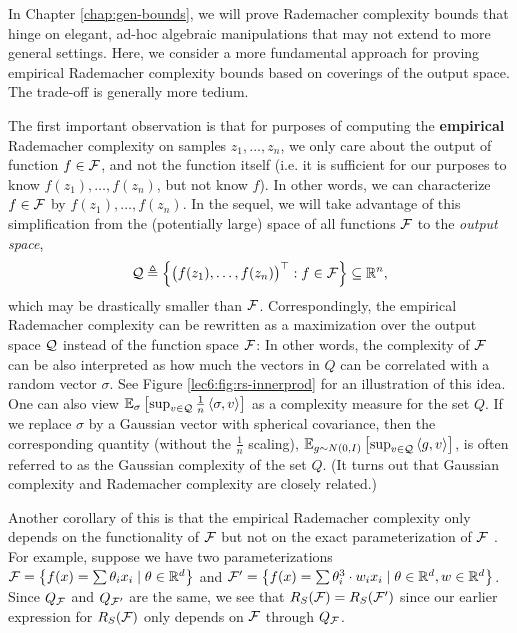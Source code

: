 
In Chapter \ref{chap:gen-bounds}, we will prove Rademacher complexity bounds that hinge on elegant, ad-hoc algebraic manipulations that may not extend to more general settings. Here, we consider a more fundamental approach for proving empirical Rademacher complexity bounds based on coverings of the output space. The trade-off is generally more tedium.

The first important observation is that for purposes of computing the \textbf{empirical} Rademacher complexity on samples $z_1, ..., z_n$, 
we only care about the output of function $f \in \mathcal F$, and not the function itself (i.e. it is sufficient for our purposes to know $f(z_1),\dots, f(z_n)$, but not know $f$). In other words, we can characterize $f \in \mathcal F$ by $f(z_1),\dots, f(z_n)$. In the sequel, we will take advantage of this simplification from the (potentially large) space of all functions $\mathcal F$ to the \textit{output space},
\begin{equation}
\mathcal Q \triangleq \left\{ \begin{pmatrix} f(z_1), \dots, f(z_n) \end{pmatrix}^\top: f\in \mathcal F\right\} \subseteq \mathbb R^n, \label{lec6:eqn:shattercoef}
\end{equation}
which may be drastically smaller than $\mathcal F$. Correspondingly, the empirical Rademacher complexity can be rewritten as a maximization over the output space $\mathcal Q$ instead of the function space $\mathcal F$: 
In other words, the complexity of $\mathcal F$ can be also interpreted as how much the vectors in $Q$ can be correlated with a random vector $\sigma.$ See Figure \ref{lec6:fig:rs-innerprod} for an illustration of this idea. One can also view $\operatorname*{\mathbb{E}}_\sigma \left[\sup_{v\in \mathcal Q} \frac 1 n \left\langle\sigma, v\right\rangle\right]$ as a complexity measure for the set $Q$. If we replace $\sigma$ by a Gaussian vector with spherical covariance, then the corresponding quantity (without the $\frac 1 n$ scaling), $\operatorname*{\mathbb{E}}_{g\sim N(0,I)} \left[\sup_{v\in \mathcal Q} \left\langle g, v\right\rangle\right]$, is often referred to as the Gaussian complexity of the set $Q$. (It turns out that Gaussian complexity and Rademacher complexity are closely related.)

Another corollary of this is that the empirical Rademacher complexity only depends on the functionality of $\mathcal F$ but not on the exact parameterization of $\mathcal F$ . For example, suppose we have two parameterizations $\mathcal F = \left\{f(x)=\sum \theta_{i} x_{i} \mid \theta \in \mathbb{R}^{d}\right\}$ and $\mathcal F' = \left\{f(x)=\sum \theta_{i}^{3} \cdot w_{i} x_{i} \mid \theta \in \mathbb R^{d}, w \in \mathbb{R}^{d}\right\}$. Since $Q_\mathcal F$ and $Q_{\mathcal F'}$ are the same, we see that $R_S(\mathcal F) = R_S(\mathcal F')$ since our earlier expression for $R_S(\mathcal F)$ only depends on $\mathcal F$ through $Q_\mathcal F$. 


